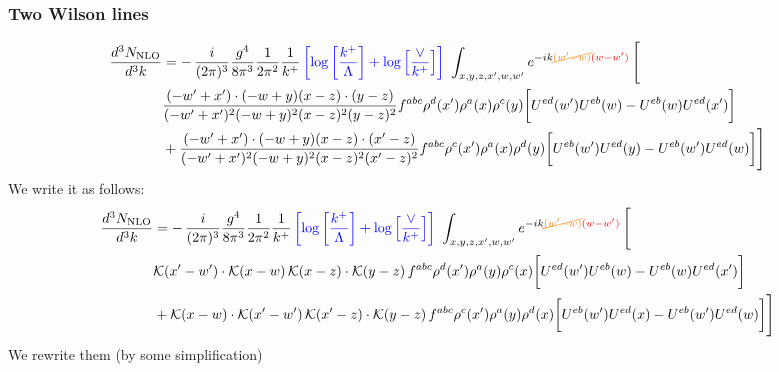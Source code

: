 \documentclass[aps,prd,amsmath,amssymb,nofootinbib]{revtex4-2}
\numberwithin{equation}{section}
\begin{document}
\subsubsection{Two Wilson lines}
\begin{align}
    \frac{d^{3}N_{\rm NLO}}{d^{3}k} & = -\,\frac{i}{(2\pi)^{3}}\frac{g^{4}}{8\pi^{3}}\frac{1}{2\pi^{2}} \frac{1}{k^{+}}\,{\color{blue}\left[\log{\left[\frac{k^{+}}{\Lambda}\right]}+\log{\left[\frac{\vee}{k^{+}}\right]}\right]}\,\,\int_{x,y,z,x^{\prime},w,w^{\prime}}e^{-ik{\color{orange}\cancel{(w^{\prime}-w)}}{\color{red}(w-w^{\prime})}}\, \Bigg[\notag \\ &  \frac{( - w' + x') \cdot ( - w + y) (x - z) \cdot (y - z)}{( - w' + x')^{2} ( - w + y)^{2} (x - z)^{2} (y - z)^{2}} f^{a b c} \rho^{d}(x') \rho^{a}(x) \rho^{c}(y) \bigg[U^{ed}(w') U^{e b}(w) - U^{e b}(w) U^{e d}(x')\bigg]\nonumber\\
    & + \frac{( - w' + x') \cdot ( - w + y) (x - z) \cdot (x' - z)}{( - w' + x')^{2} ( - w + y)^{2} (x - z)^{2} (x' - z)^{2}} f^{a b c} \rho^{c}(x') \rho^{a}(x) \rho^{d}(y) \bigg[U^{e b}(w') U^{e d}(y) - U^{eb}(w') U^{e d}(w) \bigg]\Bigg]
\end{align}
We write it as follows:
\begin{align}
    \frac{d^{3}N_{\rm NLO}}{d^{3}k} & = -\,\frac{i}{(2\pi)^{3}}\frac{g^{4}}{8\pi^{3}}\frac{1}{2\pi^{2}} \frac{1}{k^{+}}\,{\color{blue}\left[\log{\left[\frac{k^{+}}{\Lambda}\right]}+\log{\left[\frac{\vee}{k^{+}}\right]}\right]}\,\,\int_{x,y,z,x^{\prime},w,w^{\prime}}e^{-ik{\color{orange}\cancel{(w^{\prime}-w)}}{\color{red}(w-w^{\prime})}}\, \Bigg[\notag \\ &  \mathcal{K}(x'-w')\cdot \mathcal{K}(x-w)\, \mathcal{K}(x-z)\cdot \mathcal{K}(y-z)\, f^{a b c} \rho^{d}(x') \rho^{a}(y) \rho^{c}(x) \bigg[U^{ed}(w') U^{e b}(w) - U^{e b}(w) U^{e d}(x')\bigg]\nonumber\\
    & + \mathcal{K}(x-w)\cdot \mathcal{K}(x'-w')\, \mathcal{K}(x'-z)\cdot \mathcal{K}(y-z)\, f^{a b c} \rho^{c}(x') \rho^{a}(y) \rho^{d}(x) \bigg[U^{e b}(w') U^{e d}(x) - U^{eb}(w') U^{e d}(w) \bigg]\Bigg]
\end{align}
We rewrite them (by some simplification)
\end{document}
